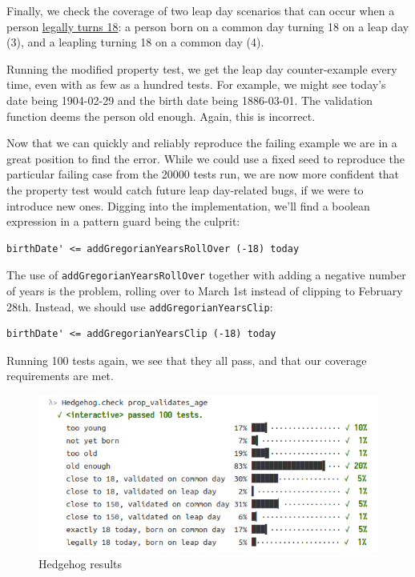 Finally, we check the coverage of two leap day scenarios that can occur
when a person
\href{https://en.wikipedia.org/wiki/February_29\#Legal_status}{legally
turns 18}: a person born on a common day turning 18 on a leap day (3),
and a leapling turning 18 on a common day (4).

Running the modified property test, we get the leap day counter-example
every time, even with as few as a hundred tests. For example, we might
see today's date being 1904-02-29 and the birth date being 1886-03-01.
The validation function deems the person old enough. Again, this is
incorrect.

Now that we can quickly and reliably reproduce the failing example we
are in a great position to find the error. While we could use a fixed
seed to reproduce the particular failing case from the 20000 tests run,
we are now more confident that the property test would catch future leap
day-related bugs, if we were to introduce new ones. Digging into the
implementation, we'll find a boolean expression in a pattern guard being
the culprit:

\begin{verbatim}
birthDate' <= addGregorianYearsRollOver (-18) today
\end{verbatim}
The use of \texttt{addGregorianYearsRollOver} together with adding a
negative number of years is the problem, rolling over to March 1st
instead of clipping to February 28th. Instead, we should use
\texttt{addGregorianYearsClip}:

\begin{verbatim}
birthDate' <= addGregorianYearsClip (-18) today
\end{verbatim}
Running 100 tests again, we see that they all pass, and that our
coverage requirements are met.

\begin{figure}[htbp]
 \centering
 \includegraphics[width=\linewidth]{./pics/hedgehog7.png}
 \caption{Hedgehog results}
 \label{fig:hedgehog7}
\end{figure}

